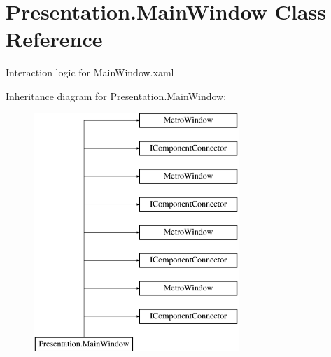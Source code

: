 \hypertarget{class_presentation_1_1_main_window}{}\section{Presentation.\+Main\+Window Class Reference}
\label{class_presentation_1_1_main_window}


Interaction logic for Main\+Window.\+xaml  


Inheritance diagram for Presentation.\+Main\+Window\+:\begin{figure}[H]
\begin{center}
\leavevmode
\includegraphics[height=9.000000cm]{class_presentation_1_1_main_window}
\end{center}
\end{figure}
